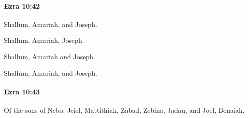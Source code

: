 		\paragraph{Ezra 10:42} %
			\label{EZRA-10-42}

			Shallum, Amariah, and Joseph.

			\begin{versebox}
					\item[BHS] 
					\item[LXX] 
					\item[ASV] Shallum, Amariah, Joseph.
					\item[NIV] Shallum, Amariah and Joseph.
					\item[NRSV] Shallum, Amariah, and Joseph.
			\end{versebox}

		\paragraph{Ezra 10:43} %
			\label{EZRA-10-43}

			Of the sons of Nebo; Jeiel, Mattithiah, Zabad, Zebina, Jadau, and Joel, Benaiah.

